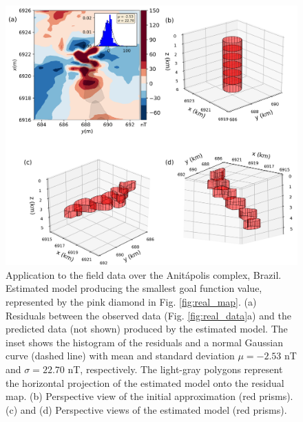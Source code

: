 \begin{figure}
	\centering
	\includegraphics[width=\linewidth]{figures/real_results_magenta_diamond.png}
	\caption{Application to the field data over the Anit{\'a}polis complex, Brazil.
	Estimated model producing the smallest goal function value, 
	represented by the pink diamond in Fig. \ref{fig:real_map}.
	(a) Residuals between the observed data (Fig. \ref{fig:real_data}a) and the 
	predicted data (not shown) produced by the estimated model. 
	The inset shows the histogram of the residuals and a normal 
	Gaussian curve (dashed line) with mean and standard deviation 
	$\mu = -2.53$ nT and $\sigma = 22.70$ nT, respectively.
	The light-gray polygons represent the horizontal projection of the estimated 
	model onto the residual map. 
	(b) Perspective view of the initial approximation (red prisms). 
	(c) and (d) Perspective views of the estimated model (red prisms).}
	\label{fig:real_result2}
\end{figure}

